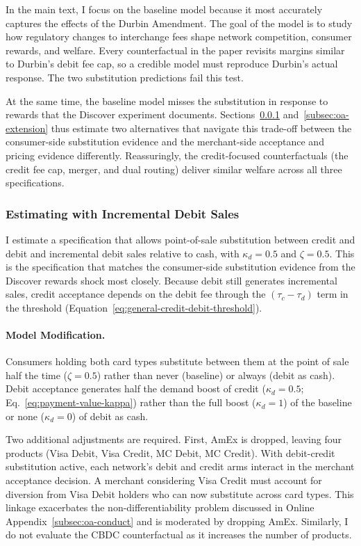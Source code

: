 \documentclass[main.tex]{subfiles}
\begin{document}
In the main text, I focus on the baseline model because it most accurately captures the effects of the Durbin Amendment.
The goal of the model is to study how regulatory changes to interchange fees shape network competition, consumer rewards, and welfare.
Every counterfactual in the paper revisits margins similar to Durbin's debit fee cap, so a credible model must reproduce Durbin's actual response.
The two substitution predictions fail this test.

At the same time, the baseline model misses the substitution in response to rewards that the Discover experiment documents.
Sections~\ref{subsec:oa-half-kappa} and~\ref{subsec:oa-extension} thus estimate two alternatives that navigate this trade-off between the consumer-side substitution evidence and the merchant-side acceptance and pricing evidence differently. 
Reassuringly, the credit-focused counterfactuals (the credit fee cap, merger, and dual routing) deliver similar welfare across all three specifications.

\subsubsection{Estimating with Incremental Debit Sales}
\label{subsec:oa-half-kappa}\label{subsubsec:oa-half-kappa}

I estimate a specification that allows point-of-sale substitution between credit and debit and incremental debit sales relative to cash, with $\kappa_d = 0.5$ and $\zeta = 0.5$.
This is the specification that matches the consumer-side substitution evidence from the Discover rewards shock most closely.
Because debit still generates incremental sales, credit acceptance depends on the debit fee through the $(\tau_c-\tau_d)$ term in the threshold (Equation~\eqref{eq:general-credit-debit-threshold}).

\paragraph{Model Modification.}

Consumers holding both card types substitute between them at the point of sale half the time ($\zeta = 0.5$) rather than never (baseline) or always (debit as cash). Debit acceptance generates half the demand boost of credit ($\kappa_d = 0.5$; Eq.~\ref{eq:payment-value-kappa}) rather than the full boost ($\kappa_d = 1$) of the baseline or none ($\kappa_d = 0$) of debit as cash.

Two additional adjustments are required.
First, AmEx is dropped, leaving four products (Visa Debit, Visa Credit, MC Debit, MC Credit).
With debit-credit substitution active, each network's debit and credit arms interact in the merchant acceptance decision. A merchant considering Visa Credit must account for diversion from Visa Debit holders who can now substitute across card types.
This linkage exacerbates the non-differentiability problem discussed in Online Appendix~\ref{subsec:oa-conduct} and is moderated by dropping AmEx.
Similarly, I do not evaluate the CBDC counterfactual as it increases the number of products.
\end{document}
